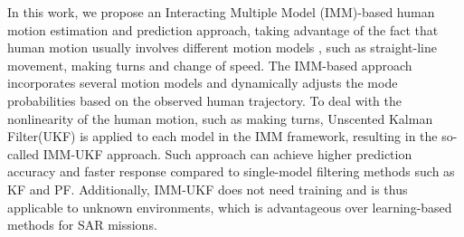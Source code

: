 \documentclass[letterpaper, 10 pt, conference]{ieeeconf}
\begin{document}
	In this work, we propose an Interacting Multiple Model (IMM)-based human motion estimation and prediction approach, taking advantage of the fact that human motion usually involves different motion models \cite{aggarwal1999human}, such as straight-line movement, making turns and change of speed.
	The IMM-based approach incorporates several motion models and dynamically adjusts the mode probabilities based on the observed human trajectory.
	To deal with the nonlinearity of the human motion, such as making turns, Unscented Kalman Filter(UKF) is applied to each model in the IMM framework, resulting in the so-called IMM-UKF approach.
	Such approach can achieve higher prediction accuracy and faster response compared to single-model filtering methods such as KF and PF. 
	Additionally, IMM-UKF does not need training and is thus applicable to unknown environments, which is advantageous over learning-based methods for SAR missions.
	
\end{document}
